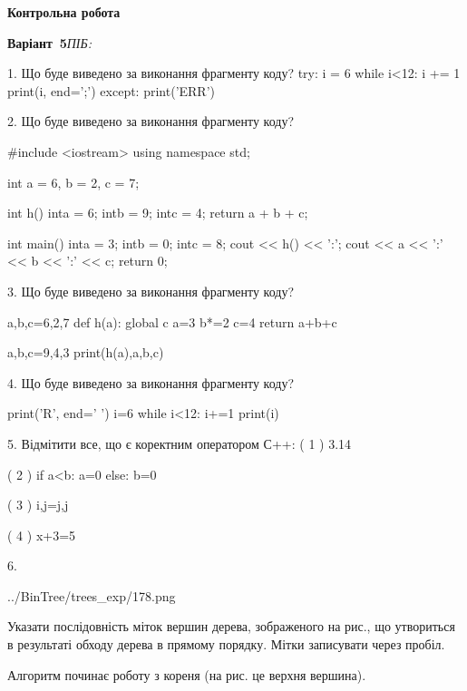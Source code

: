 \documentclass[11pt]{article}
\begin{document}
{\large\textbf{Контрольна робота}}

\textbf{Варіант \No\,5}\hfill \textit{ПІБ:}\,\underline{\hspace{60mm}}
\vspace{4mm}

1. Що буде виведено за виконання фрагменту коду?
try:
    i = 6
    while i<12:
        i += 1
    print(i, end=';')
except:
    print('ERR')
\vspace{5mm}

2. Що буде виведено за виконання фрагменту коду?

#include <iostream>
using namespace std;

int a = 6, b = 2, c = 7;

int h(){
    inta = 6;
    intb = 9;
    intc = 4;
    return a + b + c;
}

int main(){
    inta = 3;
    intb = 0;
    intc = 8;
    cout << h() << ':';
    cout << a << ':' << b << ':' << c;
    return 0;
}
\vspace{5mm}

3. Що буде виведено за виконання фрагменту коду?

a,b,c=6,2,7
def h(a):
global c    a=3
    b*=2
    c=4
    return a+b+c

a,b,c=9,4,3
print(h(a),a,b,c)
\vspace{5mm}

4. Що буде виведено за виконання фрагменту коду?

print('R', end=' ')
i=6
while i<12:
    i+=1
print(i)

\vspace{5mm}

5. %
Відмітити все, що є коректним оператором С++:
( 1 ) 3.14%

( 2 ) if a<b: a=0 else: b=0

( 3 ) i,j=j,j

( 4 ) x+3=5
\vspace{5mm}

6. 

\begin{center}
	{../BinTree/trees_exp/178.png}
\end{center}
Указати послідовність міток вершин дерева, зображеного на рис., що утвориться в результаті обходу дерева в прямому порядку. Мітки записувати через пробіл.\par Алгоритм починає роботу з кореня (на рис. це верхня вершина).
\vspace{5mm}
\end{document}
